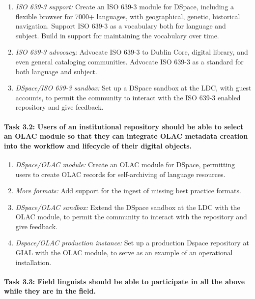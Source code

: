 \begin{enumerate}[label=\emph{\task\alph*}]
\item \emph{ISO 639-3 support:}
  Create an ISO 639-3 module for DSpace, including a flexible
  browser for 7000+ languages, with geographical, genetic, historical
  navigation. Support ISO 639-3 as a vocabulary both for language and subject.
  Build in support for maintaining the vocabulary over time.
\item \emph{ISO 639-3 advocacy:}
  Advocate ISO 639-3 to Dublin Core, digital library, and even general cataloging
  communities. Advocate ISO 639-3 as a standard for both language and subject.
\item \emph{DSpace/ISO 639-3 sandbox:}
  Set up a DSpace sandbox at the LDC, with guest accounts,
  to permit the community to interact with the
  ISO 639-3 enabled repository and give feedback.
\end{enumerate}

\def\task{3.2}
\paragraph{Task {\task}: Users of an institutional repository should be
    able to select an OLAC module so that they can integrate OLAC
    metadata creation into the workflow and lifecycle of their
    digital objects.}

\begin{enumerate}[label=\emph{\task\alph*}]
\item \emph{DSpace/OLAC module:}
  Create an OLAC module for DSpace, permitting users to create OLAC
  records for self-archiving of language resources.
\item \emph{More formats:}
  Add support for the ingest of missing best practice formats.
\item \emph{DSpace/OLAC sandbox:}
  Extend the DSpace sandbox at the LDC with the OLAC module,
  to permit the community to interact with the repository and give feedback.
\item \emph{Dspace/OLAC production instance:}
  Set up a production Dspace repository at GIAL with the OLAC module, to serve
  as an example of an operational installation. 
\end{enumerate}

\def\task{3.3}
\paragraph{Task {\task}: Field linguists should be able to participate in all the
    above while they are in the field.}

